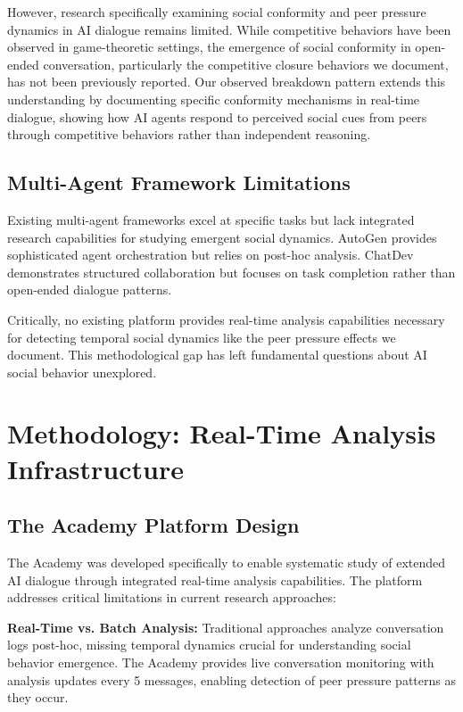 \documentclass[11pt,letterpaper]{article}
\newcommand{\theacademy}{The Academy}
\begin{document}
However, research specifically examining social conformity and peer pressure dynamics in AI dialogue remains limited. While competitive behaviors have been observed in game-theoretic settings, the emergence of social conformity in open-ended conversation, particularly the competitive closure behaviors we document, has not been previously reported. Our observed breakdown pattern extends this understanding by documenting specific conformity mechanisms in real-time dialogue, showing how AI agents respond to perceived social cues from peers through competitive behaviors rather than independent reasoning.

\subsection{Multi-Agent Framework Limitations}

Existing multi-agent frameworks excel at specific tasks but lack integrated research capabilities for studying emergent social dynamics. AutoGen \citep{wu2023autogen} provides sophisticated agent orchestration but relies on post-hoc analysis. ChatDev \citep{qian2023chatdev} demonstrates structured collaboration but focuses on task completion rather than open-ended dialogue patterns.

Critically, no existing platform provides real-time analysis capabilities necessary for detecting temporal social dynamics like the peer pressure effects we document. This methodological gap has left fundamental questions about AI social behavior unexplored.

\section{Methodology: Real-Time Analysis Infrastructure}

\subsection{The Academy Platform Design}

\theacademy{} was developed specifically to enable systematic study of extended AI dialogue through integrated real-time analysis capabilities. The platform addresses critical limitations in current research approaches:

\textbf{Real-Time vs. Batch Analysis:} Traditional approaches analyze conversation logs post-hoc, missing temporal dynamics crucial for understanding social behavior emergence. \theacademy{} provides live conversation monitoring with analysis updates every 5 messages, enabling detection of peer pressure patterns as they occur.
\end{document}
